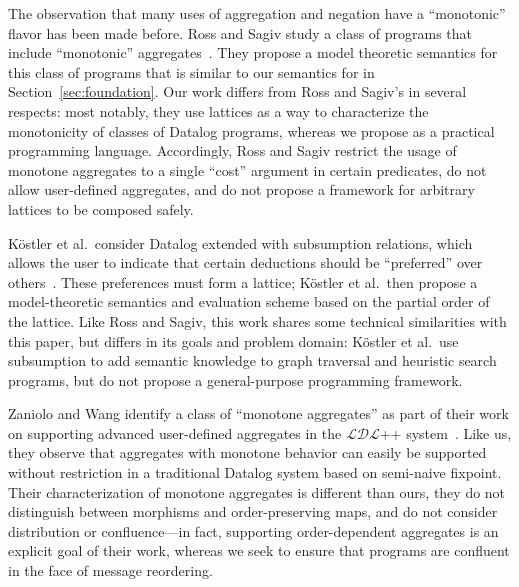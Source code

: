 The observation that many uses of aggregation and negation have a ``monotonic''
flavor has been made before. Ross and Sagiv study a class of programs that
include ``monotonic'' aggregates~\cite{Ross1992}. They propose a model theoretic
semantics for this class of programs that is similar to our semantics for
\baselang in Section~\ref{sec:foundation}. Our work differs from Ross and
Sagiv's in several respects: most notably, they use lattices as a way to
characterize the monotonicity of classes of Datalog programs, whereas we propose
\lang as a practical programming language. Accordingly, Ross and Sagiv restrict
the usage of monotone aggregates to a single ``cost'' argument in certain
predicates, do not allow user-defined aggregates, and do not propose a framework
for arbitrary lattices to be composed safely.

K\"{o}stler et al.\ consider Datalog extended with subsumption relations, which
allows the user to indicate that certain deductions should be ``preferred'' over
others~\cite{Kostler1995}. These preferences must form a lattice; K\"{o}stler et
al.\ then propose a model-theoretic semantics and evaluation scheme based on the
partial order of the lattice. Like Ross and Sagiv, this work shares some
technical similarities with this paper, but differs in its goals and problem
domain: K\"{o}stler et al.\ use subsumption to add semantic knowledge to graph
traversal and heuristic search programs, but do not propose a general-purpose
programming framework.

Zaniolo and Wang identify a class of ``monotone aggregates'' as part of their
work on supporting advanced user-defined aggregates in the $\mathcal{LDL}$++
system~\cite{Zaniolo1999}. Like us, they observe that aggregates with monotone
behavior can easily be supported without restriction in a traditional Datalog
system based on semi-naive fixpoint. Their characterization of monotone
aggregates is different than ours, they do not distinguish between morphisms and
order-preserving maps, and do not consider distribution or confluence---in fact,
supporting order-dependent aggregates is an explicit goal of their work, whereas
we seek to ensure that programs are confluent in the face of message reordering.
